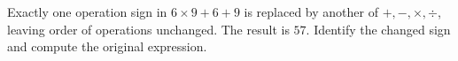 Exactly one operation sign in $6\times9+6+9$ is replaced by another of $+,-,\times,\div$, leaving order of operations unchanged. The result is $57$. Identify the changed sign and compute the original expression.
